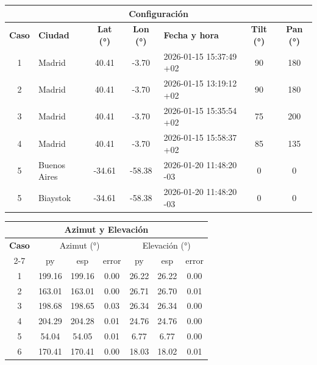\begin{table}[h!]
	\centering
	\scriptsize
	\setlength{\tabcolsep}{4pt}
\begin{tabular}{|c|l|c|c|l|c|c|}
	\hline
	\multicolumn{7}{|c|}{\textbf{Configuración}} \\ \hline
	\textbf{Caso} & \textbf{Ciudad} & \textbf{Lat (°)} & \textbf{Lon (°)} & \textbf{Fecha y hora} & \textbf{Tilt (°)} & \textbf{Pan (°)} \\ \hline
	1 & Madrid        & 40.41  & -3.70  & 2026-01-15 15:37:49 +02 & 90 & 180 \\
	2 & Madrid        & 40.41  & -3.70  & 2026-01-15 13:19:12 +02 & 90 & 180 \\
	3 & Madrid        & 40.41  & -3.70  & 2026-01-15 15:35:54 +02 & 75 & 200 \\
	4 & Madrid        & 40.41  & -3.70  & 2026-01-15 15:58:37 +02 & 85 & 135 \\
	5 & Buenos Aires  & -34.61 & -58.38 & 2026-01-20 11:48:20 -03 & 0  & 0   \\ 
	5 & Bia\text{\l}ystok & -34.61 & -58.38 & 2026-01-20 11:48:20 -03 & 0  & 0   \\ \hline
\end{tabular}

	\vspace{0.4cm}
	
	\begin{tabular}{|c|ccc|ccc|}
		\hline
		\multicolumn{7}{|c|}{\textbf{Azimut y Elevación}} \\ \hline
		\textbf{Caso} &
		\multicolumn{3}{c|}{Azimut (°)} &
		\multicolumn{3}{c|}{Elevación (°)} \\ \cline{2-7}
		& py & esp & error & py & esp & error \\ \hline
		1 & 199.16 & 199.16 & 0.00 & 26.22 & 26.22 & 0.00 \\
		2 & 163.01 & 163.01 & 0.00 & 26.71 & 26.70 & 0.01 \\
		3 & 198.68 & 198.65 & 0.03 & 26.34 & 26.34 & 0.00 \\
		4 & 204.29 & 204.28 & 0.01 & 24.76 & 24.76 & 0.00 \\
		5 & 54.04  & 54.05  & 0.01 & 6.77  & 6.77  & 0.00 \\
		6 & 170.41 & 170.41 & 0.00 & 18.03 & 18.02 & 0.01  \\ \hline
	\end{tabular}
	
	\vspace{0.4cm}
	

\end{table}
